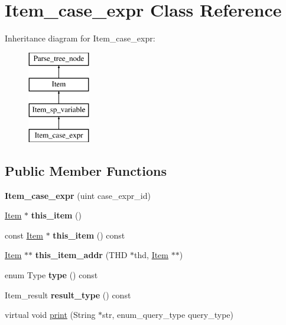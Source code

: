 \hypertarget{classItem__case__expr}{}\section{Item\+\_\+case\+\_\+expr Class Reference}
\label{classItem__case__expr}
Inheritance diagram for Item\+\_\+case\+\_\+expr\+:\begin{figure}[H]
\begin{center}
\leavevmode
\includegraphics[height=4.000000cm]{classItem__case__expr}
\end{center}
\end{figure}
\subsection*{Public Member Functions}
\begin{DoxyCompactItemize}
\item 
\mbox{\label{classItem__case__expr_aaa9be6e93d28dc314b680218eaef131f}} 
{\bfseries Item\+\_\+case\+\_\+expr} (uint case\+\_\+expr\+\_\+id)
\item 
\mbox{\label{classItem__case__expr_a2ba379208d8ad2488c5c876a3f13ca26}} 
\mbox{\hyperlink{classItem}{Item}} $\ast$ {\bfseries this\+\_\+item} ()
\item 
\mbox{\label{classItem__case__expr_a37b635b2e33abc0476ead23b15017251}} 
const \mbox{\hyperlink{classItem}{Item}} $\ast$ {\bfseries this\+\_\+item} () const
\item 
\mbox{\label{classItem__case__expr_a6bfbafa448740725d99baa6298345d1c}} 
\mbox{\hyperlink{classItem}{Item}} $\ast$$\ast$ {\bfseries this\+\_\+item\+\_\+addr} (T\+HD $\ast$thd, \mbox{\hyperlink{classItem}{Item}} $\ast$$\ast$)
\item 
\mbox{\label{classItem__case__expr_a19eefac56d196dfd6b8051f76dd023aa}} 
enum Type {\bfseries type} () const
\item 
\mbox{\label{classItem__case__expr_ac0d927352ddc3295bf4d2272df045bfb}} 
Item\+\_\+result {\bfseries result\+\_\+type} () const
\item 
virtual void \mbox{\hyperlink{classItem__case__expr_aaa00c7acd64b436ca4218d15ba8aa34e}{print}} (String $\ast$str, enum\+\_\+query\+\_\+type query\+\_\+type)
\end{DoxyCompactItemize}
